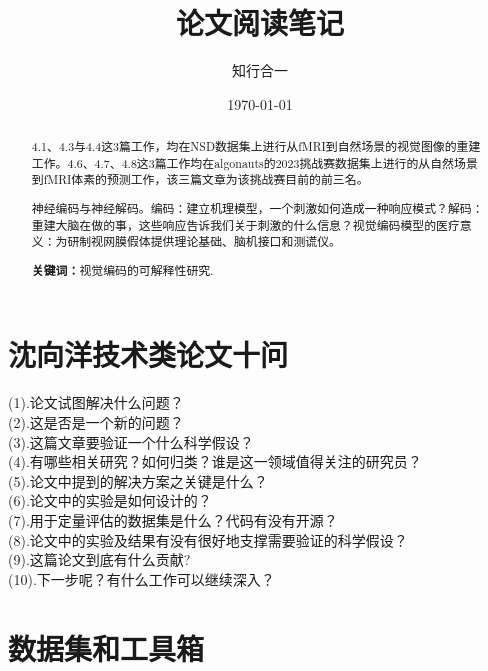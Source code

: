 \documentclass[12pt, a4paper, oneside]{ctexart}
\title{\textbf{论文阅读笔记}}
\author{知行合一}
\date{\today}
\begin{document}
    \maketitle

    \setcounter{page}{0}
    \maketitle
    \thispagestyle{empty}


    \begin{abstract}
        4.1、4.3与4.4这3篇工作，均在NSD数据集上进行从fMRI到自然场景的视觉图像的重建工作。4.6、4.7、4.8这3篇工作均在algonauts的2023挑战赛数据集上进行的从自然场景到fMRI体素的预测工作，该三篇文章为该挑战赛目前的前三名。

        神经编码与神经解码。编码：建立机理模型，一个刺激如何造成一种响应模式？解码：重建大脑在做的事，这些响应告诉我们关于刺激的什么信息？视觉编码模型的医疗意义：为研制视网膜假体提供理论基础、脑机接口和测谎仪。

    \noindent\textbf{关键词：}视觉编码的可解释性研究.
    \end{abstract}


    \newpage
    \setcounter{page}{1}
    \tableofcontents
    \newpage
    \setcounter{page}{1}

    \section{沈向洋技术类论文十问}
    \noindent(1).论文试图解决什么问题？\\
    (2).这是否是一个新的问题？\\
    (3).这篇文章要验证一个什么科学假设？\\
    (4).有哪些相关研究？如何归类？谁是这一领域值得关注的研究员？\\
    (5).论文中提到的解决方案之关键是什么？\\
    (6).论文中的实验是如何设计的？\\
    (7).用于定量评估的数据集是什么？代码有没有开源？\\
    (8).论文中的实验及结果有没有很好地支撑需要验证的科学假设？\\
    (9).这篇论文到底有什么贡献?\\
    (10).下一步呢？有什么工作可以继续深入？\\

    \section{数据集和工具箱}
\end{document}
